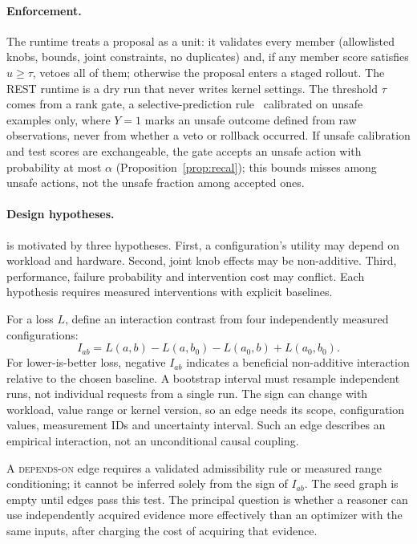 \paragraph{Enforcement.}
The runtime treats a proposal as a unit: it validates every member (allowlisted knobs, bounds, joint constraints, no duplicates) and, if any member score satisfies $u\ge\tau$, vetoes all of them; otherwise the proposal enters a staged rollout. The REST runtime is a dry run that never writes kernel settings. The threshold $\tau$ comes from a rank gate, a selective-prediction rule~\cite{Geifman2017Selective} calibrated on unsafe examples only, where $Y=1$ marks an unsafe outcome defined from raw observations, never from whether a veto or rollback occurred. If unsafe calibration and test scores are exchangeable, the gate accepts an unsafe action with probability at most $\alpha$ (Proposition~\ref{prop:recal}); this bounds misses among unsafe actions, not the unsafe fraction among accepted ones.

\paragraph{Design hypotheses.}
\sysname is motivated by three hypotheses. First, a configuration's utility may depend on workload and hardware. Second, joint knob effects may be non-additive. Third, performance, failure probability and intervention cost may conflict. Each hypothesis requires measured interventions with explicit baselines.

For a loss $L$, define an interaction contrast from four independently measured configurations:
\[
 I_{ab}=L(a,b)-L(a,b_0)-L(a_0,b)+L(a_0,b_0).
\]
For lower-is-better loss, negative $I_{ab}$ indicates a beneficial non-additive interaction relative to the chosen baseline. A bootstrap interval must resample independent runs, not individual requests from a single run. The sign can change with workload, value range or kernel version, so an edge needs its scope, configuration values, measurement IDs and uncertainty interval. Such an edge describes an empirical interaction, not an unconditional causal coupling.

A \textsc{depends-on} edge requires a validated admissibility rule or measured range conditioning; it cannot be inferred solely from the sign of $I_{ab}$. The seed graph is empty until edges pass this test. The principal question is whether a reasoner can use independently acquired evidence more effectively than an optimizer with the same inputs, after charging the cost of acquiring that evidence.

